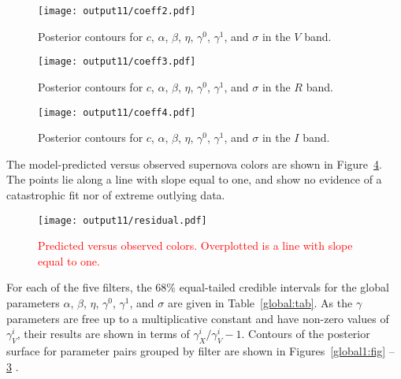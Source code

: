 \documentclass{aastex61}   	%
\begin{document}
\begin{figure}[htbp] %
   \centering
   \texttt{[image: output11/coeff2.pdf]} 
            \caption{Posterior contours for $c$, $\alpha$, $\beta$, $\eta$, $\gamma^0$, $\gamma^1$, and $\sigma$ in the $V$ band.
 \label{global3:fig}}
\end{figure}

\begin{figure}[htbp] %
   \centering
      \texttt{[image: output11/coeff3.pdf]} 
            \caption{Posterior contours for $c$, $\alpha$, $\beta$, $\eta$, $\gamma^0$, $\gamma^1$, and $\sigma$ in the $R$ band.
 \label{global4:fig}}
\end{figure}

\begin{figure}[htbp] %
   \centering
         \texttt{[image: output11/coeff4.pdf]} 
            \caption{Posterior contours for $c$, $\alpha$, $\beta$, $\eta$, $\gamma^0$, $\gamma^1$, and $\sigma$ in the $I$ band.
 \label{global5:fig}}
\end{figure}

\color{red}

The model-predicted versus observed supernova colors are shown in Figure~\ref{residual:fig}.
The points lie along a line with slope equal to one, and show no evidence of a catastrophic fit nor of extreme
outlying data.

\begin{figure}[htbp] %
   \centering
   \texttt{[image: output11/residual.pdf]} 
            \caption{\textcolor{red}{Predicted versus observed colors.  Overplotted is a line with slope equal to one.}
            \label{residual:fig}}
\end{figure}

\color{black}

For each of the five filters, the 68\%  equal-tailed credible intervals for the global parameters $\alpha$, $\beta$, $\eta$, $\gamma^0$, $\gamma^1$, and $\sigma$
are given in Table~\ref{global:tab}.
\color{red}
As the $\gamma$ parameters are free up to a multiplicative constant and have non-zero values of $\gamma^i_V$,
their results are shown in terms of $\gamma^i_X/\gamma^i_V-1$.
\color{black}
Contours of the posterior surface for parameter pairs grouped by filter are shown in Figures~\ref{global1:fig} -- \ref{global5:fig} .
\end{document}
